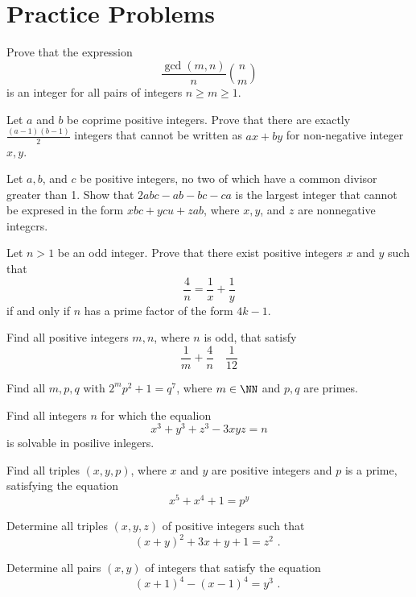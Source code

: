 \documentclass[11pt]{scrartcl}
\begin{document}
\section{Practice Problems}
\begin{problem}
Prove that the expression
\[\frac{\gcd(m,n)}{n} \binom{n}{m}\]
is an integer for all pairs of integers \(n \geq m \geq 1\).
\end{problem}
\begin{problem}
Let \(a\) and \(b\) be coprime positive integers. Prove that there are exactly \(\frac{(a-1)(b-1)}{2}\) integers that cannot be written as \(ax+by\) for non-negative integer \(x,y\).
\end{problem}
\begin{problem}
Let \(a, b\), and \(c\) be positive integers, no two of which have a common divisor greater than 1. Show that \(2 a b c-a b-b c-c a\) is the largest integer that cannot be expresed in the form \(x b c+y c u+z a b\), where \(x, y\), and \(z\) are nonnegative integcrs.
\end{problem}
\begin{problem}
Let \(n>1\) be an odd integer. Prove that there exist positive integers \(x\) and \(y\) such that
\[
\frac{4}{n}=\frac{1}{x}+\frac{1}{y}
\]
if and only if \(n\) has a prime factor of the form \(4 k-1 .\)
\end{problem}
\begin{problem}
Find all positive integers \(m, n\), where \(n\) is odd, that satisfy
\[
\frac{1}{m}+\frac{4}{n} \quad \frac{1}{12}
\]
\end{problem}
\begin{problem}
Find all \(m,p,q\) with \(2^mp^2 + 1 = q^7\), where \(m\in\NN\) and \(p,q\) are primes.
\end{problem}
\begin{problem}
Find all integers \(n\) for which the equalion
\[
x^{3}+y^{3}+z^{3}-3 x y z=n
\]
is solvable in posilive inlegers.
\end{problem}
\begin{problem}
Find all triples \((x, y, p)\), where \(x\) and \(y\) are positive integers
and \(p\) is a prime, satisfying the equation
\[
x^{5}+x^{4}+1=p^{y}
\]
\end{problem}
\begin{problem}
Determine all triples \((x, y, z)\) of positive integers such that
\[
(x+y)^{2}+3 x+y+1=z^{2} \text { . }
\]
\end{problem}
\begin{problem}
Determine all pairs \((x, y)\) of integers that satisfy the equation
\[
(x+1)^{4}-(x-1)^{4}=y^{3} \text { . }
\]
\end{problem}
\end{document}
